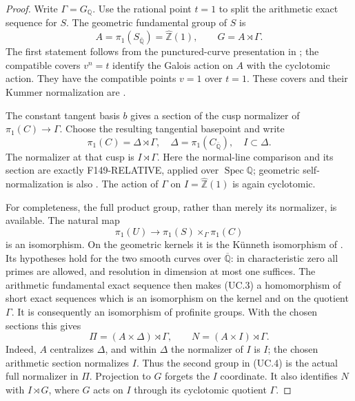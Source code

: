 \begin{proof}
Write $\Gamma=G_{\mathbb Q}$. Use the rational point $t=1$ to
split the arithmetic exact sequence for $S$. The geometric
fundamental group of $S$ is
\[
 A=\pi_1(S_{\overline{\mathbb Q}})=\widehat{\mathbb Z}(1),
 \qquad G=A\rtimes\Gamma.                                  \tag{UC.2}
\]
The first statement follows from the punctured-curve presentation
in \cite[Expos\'e XIII, Corollaire~2.12, pp.~290--292]{SGA1};
the compatible covers $v^n=t$ identify the Galois action on $A$
with the cyclotomic action. They have the compatible points $v=1$
over $t=1$. These covers and their Kummer normalization are
\cite[Expos\'e XI, Proposition~6.1 and \S6.2--6.5,
pp.~233--235]{SGA1}.

The constant tangent basis $b$ gives a section of the cusp
normalizer of $\pi_1(C)\to\Gamma$. Choose the resulting tangential
basepoint and write
\[
 \pi_1(C)=\Delta\rtimes\Gamma,
 \quad \Delta=\pi_1(C_{\overline{\mathbb Q}}),
 \quad I\subset\Delta.
\]
The normalizer at that cusp is $I\rtimes\Gamma$.
Here the normal-line comparison and its section are exactly
F149-RELATIVE, applied over $\operatorname{Spec}\mathbb Q$;
geometric self-normalization is also
\cite[Proposition~16, p.~8]{StixCuspidal2012}.
The action of $\Gamma$ on $I=\widehat{\mathbb Z}(1)$ is again
cyclotomic.

For completeness, the full product group, rather than merely
its normalizer, is available. The natural map
\[
 \pi_1(U)\longrightarrow
        \pi_1(S)\mathbin{\times}_{\Gamma}\pi_1(C)             \tag{UC.3}
\]
is an isomorphism. On the geometric kernels it is the
K\"unneth isomorphism of
\cite[Expos\'e XIII, Proposition~4.6, pp.~310--311]{SGA1}.
Its hypotheses hold for the two smooth curves over
$\overline{\mathbb Q}$: in characteristic zero all primes are
allowed, and resolution in dimension at most one suffices.
The arithmetic fundamental exact sequence
\cite[Expos\'e IX, Th\'eor\`eme~6.1, p.~195]{SGA1} then makes
(UC.3) a homomorphism of short exact sequences which is an
isomorphism on the kernel and on the quotient $\Gamma$.
It is consequently an isomorphism of profinite groups.
With the chosen sections this gives
\[
 \Pi=(A\times\Delta)\rtimes\Gamma,
 \qquad N=(A\times I)\rtimes\Gamma.                         \tag{UC.4}
\]
Indeed, $A$ centralizes $\Delta$, and within $\Delta$ the
normalizer of $I$ is $I$; the chosen arithmetic section normalizes
$I$. Thus the second group in (UC.4) is the actual full
normalizer in $\Pi$. Projection to $G$ forgets the $I$ coordinate.
It also identifies $N$ with $I\rtimes G$, where $G$ acts on $I$
through its cyclotomic quotient $\Gamma$.


\end{proof}
